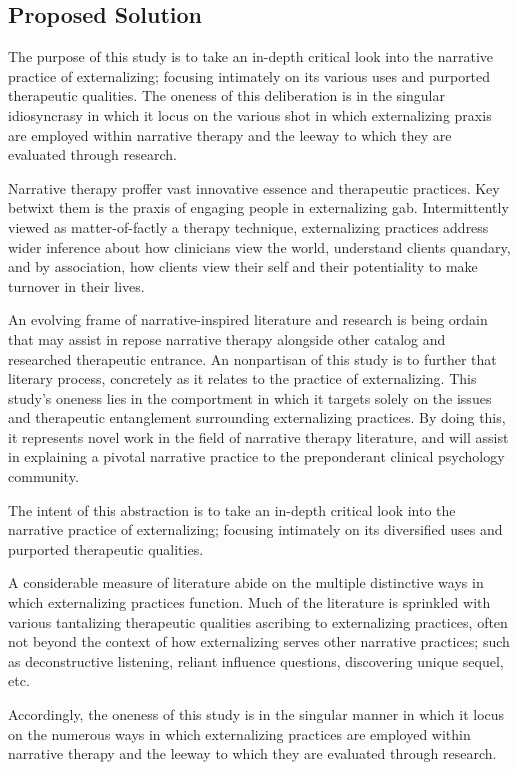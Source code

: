 \documentclass[conference,compsoc]{IEEEtran}
\begin{document}
\subsection{Proposed Solution}

The purpose of this study is to take an in-depth critical look into the narrative practice of externalizing; focusing intimately on its various uses and purported therapeutic qualities. The oneness of this deliberation is in the singular idiosyncrasy in which it locus on the various shot in which externalizing praxis are employed within narrative therapy and the leeway to which they are evaluated through research.

Narrative therapy proffer vast innovative essence and therapeutic practices. Key betwixt them is the praxis of engaging people in externalizing gab. Intermittently viewed as matter-of-factly a therapy technique, externalizing practices address wider inference about how clinicians view the world, understand clients quandary, and by association, how clients view their self and their potentiality to make turnover in their lives.

An evolving frame of narrative-inspired literature and research is being ordain that may assist in repose narrative therapy alongside other catalog and researched therapeutic entrance. An nonpartisan of this study is to further that literary process, concretely as it relates to the practice of externalizing. This study’s oneness lies in the comportment in which it targets solely on the issues and therapeutic entanglement surrounding externalizing practices. By doing this, it represents novel work in the field of narrative therapy literature, and will assist in explaining a pivotal narrative practice to the preponderant clinical psychology community.

The intent of this abstraction is to take an in-depth critical look into the narrative practice of externalizing; focusing intimately on its diversified uses and purported therapeutic qualities.

A considerable measure of literature abide on the multiple distinctive ways in which externalizing practices function. Much of the literature is sprinkled with various tantalizing therapeutic qualities ascribing to externalizing practices, often not beyond the context of how externalizing serves other narrative practices; such as deconstructive listening, reliant influence questions, discovering unique sequel, etc.

Accordingly, the oneness of this study is in the singular manner in which it locus on the numerous ways in which externalizing practices are employed within narrative therapy and the leeway to which they are evaluated through research.
\end{document}
